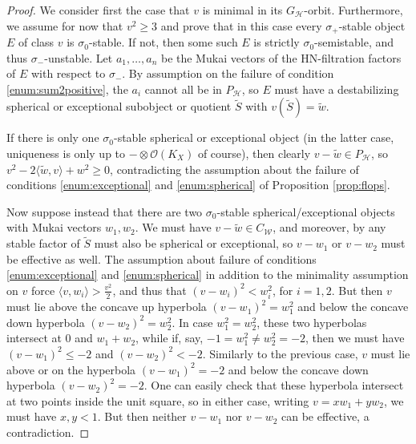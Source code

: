 \documentclass[leqno,11pt]{amsart}
\theoremstyle{definition}
\def\HH{\ensuremath{\mathcal H}}
\def\OO{\ensuremath{\mathcal O}}
\def\WW{\ensuremath{\mathcal W}}
\begin{document}
\begin{proof}
We consider first the case that $v$ is minimal in its $G_{\HH}$-orbit.  Furthermore, we assume for now that $v^2\geq 3$ and prove that in this case every $\sigma_+$-stable object $E$ of class $v$ is $\sigma_0$-stable.  If not, then some such $E$ is strictly $\sigma_0$-semistable, and thus $\sigma_-$-unstable.  Let $a_1,\ldots,a_n$ be the Mukai vectors of the HN-filtration factors of $E$ with respect to $\sigma_-$.  By assumption on the failure of condition \ref{enum:sum2positive}, the $a_i$ cannot all be in $P_{\HH}$, so $E$ must have a destabilizing spherical or exceptional subobject or quotient $\tilde{S}$ with $v(\tilde{S})=\tilde{w}$.  

If there is only one $\sigma_0$-stable spherical or exceptional object (in the latter case, uniqueness is only up to $-\otimes\OO(K_X)$ of course), then clearly $v-\tilde{w}\in P_{\HH}$, so $v^2-2\langle \tilde{w},v\rangle+w^2\geq 0$, contradicting the assumption about the failure of conditions \ref{enum:exceptional} and \ref{enum:spherical} of Proposition \ref{prop:flops}.


Now suppose instead that there are two $\sigma_0$-stable spherical/exceptional objects with Mukai vectors $w_1,w_2$.  We must have $v-\tilde{w}\in C_{\WW}$, and moreover, by \cite[Lemma 4.6]{Yos16b} any stable factor of $\tilde{S}$ must also be spherical or exceptional, so $v-w_1$ or $v-w_2$ must be effective as well.  The assumption about failure of conditions \ref{enum:exceptional} and \ref{enum:spherical} in addition to the minimality assumption on $v$ force $\langle v,w_i\rangle>\frac{v^2}{2}$, and thus that $(v-w_i)^2<w_i^2$, for $i=1,2$.  But then $v$ must lie above the concave up hyperbola $(v-w_1)^2=w_1^2$ and below the concave down hyperbola $(v-w_2)^2=w_2^2$.  In case $w_1^2=w_2^2$, these two hyperbolas intersect at 0 and $w_1+w_2$, while if, say, $-1=w_1^2\neq w_2^2=-2$, then we must have $(v-w_1)^2\leq -2$ and $(v-w_2)^2<-2$.  Similarly to the previous case, $v$ must lie above or on the hyperbola $(v-w_1)^2=-2$ and below the concave down hyperbola $(v-w_2)^2=-2$.  One can easily check that these hyperbola intersect at two points inside the unit square, so in either case, writing $v=xw_1+yw_2$, we must have $x,y<1$.  But then neither $v-w_1$ nor $v-w_2$ can be effective, a contradiction.


\end{proof}
\end{document}
